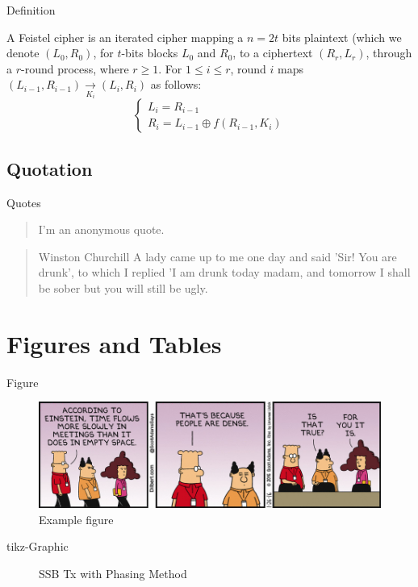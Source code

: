 \documentclass[aspectratio=169,envcountsect]{beamer}    %
\begin{document}
\begin{frame}{Definition}
	\begin{definition}
		A Feistel cipher is an iterated cipher mapping a $n = 2t$ bits plaintext (which we denote $(L_0,R_0)$, for $t$-bits blocks $L_0$ and $R_0$, to a ciphertext $(R_r,L_r)$, through a $r$-round process, where $r\geq 1$. For $1 \leq i \leq r$, round $i$ maps $(L_{i-1},R_{i-1}) \underset{K_i}{\rightarrow} (L_i,R_i)$ as follows:
		\[
			\left\{\begin{array}{l}
				L_i = R_{i-1}\\
				R_i = L_{i-1} \oplus f(R_{i-1},K_i)
			\end{array}\right.
		\]
	\end{definition}
\end{frame}

\subsection{Quotation}
\begin{frame}{Quotes}
	\begin{quote}{}
		I'm an anonymous quote.
	\end{quote}
	\begin{quote}{Winston Churchill}
		A lady came up to me one day and said 'Sir! You are drunk', to which I replied 'I am drunk today madam, and tomorrow I shall be sober but you will still be ugly.
	\end{quote}
\end{frame}

\section{Figures and Tables}
\begin{frame}{Figure}
	\begin{figure}[h]
		\centering
		\includegraphics[width=.8\textwidth]{images/example}
		\caption{Example figure}
		\label{fig:ex1}
	\end{figure}	
\end{frame}

\begin{frame}{tikz-Graphic}
	\begin{figure}[h]
		\centering
		
		\caption{SSB Tx with Phasing Method}
		\label{fig:ex2}
	\end{figure}	
\end{frame}
\end{document}
